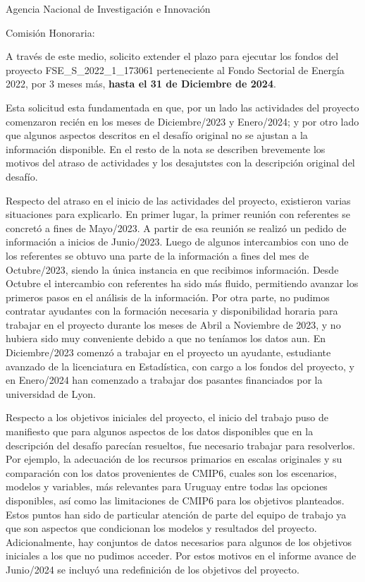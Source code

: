 \documentclass{letter}\usepackage[]{graphicx}\usepackage[]{xcolor}
\date{Montevideo, 15 de Agosto de 2024}
\begin{document}
\begin{letter}{Agencia Nacional de Investigación e Innovación}
\opening{Comisión Honoraria:}

A través de este medio, solicito extender el plazo para ejecutar los fondos del proyecto FSE\_S\_2022\_1\_173061 perteneciente al Fondo Sectorial de Energía 2022, por 3 meses más, \textbf{hasta el 31 de Diciembre de 2024}. 

Esta solicitud esta fundamentada en que, por un lado las actividades del proyecto comenzaron recién en los meses de Diciembre/2023 y Enero/2024; y por otro lado que algunos aspectos descritos en el desafío original no se ajustan a la información disponible. En el resto de la nota se describen brevemente los motivos del atraso de actividades y los desajutstes con la descripción original del desafío. 

Respecto del atraso en el inicio de las actividades del proyecto, existieron varias situaciones para explicarlo.  En primer lugar, la primer reunión con referentes se concretó a fines de Mayo/2023. A partir de esa reunión se realizó un pedido de información a inicios de Junio/2023. Luego de algunos intercambios con uno de los referentes se obtuvo una parte de la información a fines del mes de Octubre/2023, siendo la única instancia en que recibimos información. Desde Octubre el intercambio con referentes ha sido más fluido, permitiendo avanzar los primeros pasos en el análisis de la información. Por otra parte, no pudimos contratar ayudantes con la formación necesaria y disponibilidad horaria para trabajar en el proyecto durante los meses de Abril a Noviembre de 2023, y no hubiera sido muy conveniente debido a que no teníamos los datos aun. En Diciembre/2023 comenzó a trabajar en el proyecto un ayudante, estudiante avanzado de la licenciatura en Estadística, con cargo a los fondos del proyecto, y en Enero/2024 han comenzado a trabajar dos pasantes financiados por la universidad de Lyon.  

Respecto a los objetivos iniciales del proyecto, el inicio del trabajo puso de manifiesto que para algunos aspectos de los datos disponibles que en la descripción del desafío parecían resueltos, fue necesario trabajar para resolverlos. Por ejemplo, la adecuación de los recursos primarios en escalas originales y su comparación con los datos provenientes de CMIP6, cuales son los escenarios, modelos y variables, más relevantes para Uruguay entre todas las opciones disponibles, así como las limitaciones de CMIP6 para los objetivos planteados. Estos puntos han sido de particular atención de parte del equipo de trabajo ya que son aspectos que condicionan los modelos y resultados del proyecto. Adicionalmente, hay conjuntos de datos necesarios para algunos de los objetivos iniciales a los que no pudimos acceder. Por estos motivos en el informe avance de Junio/2024 se incluyó una redefinición de los objetivos del proyecto.  


\end{letter}
\end{document}
